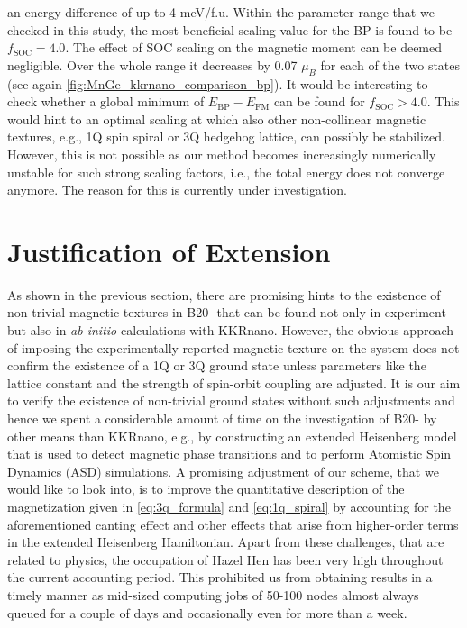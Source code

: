 \documentclass [a4paper, 12pt]{article}
\begin{document}
an energy difference of up to 4 meV/f.u.
Within the parameter range that we checked in this study,
the most beneficial scaling value for the BP is found to be $f_{\text{SOC}}=4.0$.
The effect of SOC scaling on the magnetic moment can be deemed negligible. Over the whole
range it decreases by 0.07 $\mu_{B}$ for each of the two states
(see again \cref{fig:MnGe_kkrnano_comparison_bp}).
It would be interesting to check whether a global minimum of $E_{\text{BP}}-E_{\text{FM}}$ can
be found for $f_{\text{SOC}} > 4.0$. This would hint to an optimal
scaling at which also other non-collinear magnetic textures, e.g., 1Q spin spiral or
3Q hedgehog lattice, can possibly be stabilized.
However, this is not possible as our method becomes increasingly numerically unstable for 
such strong scaling factors, i.e., the total energy does not converge anymore.
The reason for this is currently under investigation.

\FloatBarrier

\section{Justification of Extension}
As shown in the previous section, there are promising hints to the existence of non-trivial magnetic textures in
B20- that can be found not only in experiment but also in \textit{ab initio} calculations with KKRnano.
However, the obvious approach of imposing the experimentally reported magnetic texture on the system does not
confirm the existence of a 1Q or 3Q ground state unless parameters like the lattice constant and the strength of 
spin-orbit coupling are adjusted.
It is our aim to verify the existence of non-trivial ground states without such adjustments and hence
we spent a considerable amount of time on the investigation of B20- by other means than KKRnano, e.g.,
by constructing an extended Heisenberg model that is used to detect magnetic phase transitions and
to perform Atomistic Spin Dynamics (ASD) simulations.
A promising adjustment of our scheme, that we would like to
look into, is to improve the quantitative description of the magnetization given in
\cref{eq:3q_formula} and \cref{eq:1q_spiral} by accounting for the aforementioned canting effect and
other effects that arise from higher-order terms in the extended Heisenberg Hamiltonian.
Apart from these challenges, that are related to physics,
the occupation of Hazel Hen has been very high throughout the current accounting period.
This prohibited us from obtaining results in a timely manner as mid-sized computing jobs of 50-100 nodes
almost always queued for a couple of days and occasionally even for more than a week.





\end{document}
